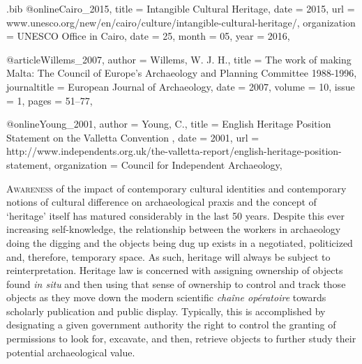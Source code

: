\begin{filecontents}{\IJSRAidentifier.bib}
@online{Cairo_2015,
	title = {Intangible Cultural Heritage},
	date = {2015},
	url = {www.unesco.org/new/en/cairo/culture/intangible-cultural-heritage/},
	organization = {UNESCO Office in Cairo},
	date = {25},
	month = {05},
	year = {2016},
}

@article{Willems_2007,
	author = {Willems, W. J. H.},
	title = {The work of making Malta: The Council of Europe’s Archaeology and Planning Committee 1988-1996},
	journaltitle = {European Journal of Archaeology},
	date = {2007},
	volume = {10},
	issue = {1},
	pages = {51--77},
}

@online{Young_2001,
	author = {Young, C.},
	title = {English Heritage Position Statement on the Valletta Convention },
	date = {2001},
	url = {http://www.independents.org.uk/the-valletta-report/english-heritage-position-statement},
	organization = {Council for Independent Archaeology},
}


\end{filecontents}

%
\IJSRAopening
\lettrine{A}{wareness} of the impact of contemporary cultural identities and contemporary notions of cultural difference on archaeological praxis and the concept of ‘heritage’ itself has matured considerably in the last 50 years. Despite this ever increasing self-knowledge, the relationship between the workers in archaeology  doing the digging and the objects being dug up exists in a negotiated, politicized and, therefore, temporary space. As such, heritage will always be subject to reinterpretation. Heritage law is concerned with assigning ownership of objects found \textit{in situ} and then using that sense of ownership to control and track those objects as they move down the modern scientific \textit{chaîne opératoire} towards scholarly publication and public display. Typically, this is accomplished by designating a given government authority the right to control the granting of permissions to look for, excavate, and then, retrieve objects to further study their potential archaeological value.

